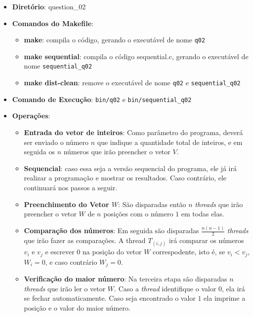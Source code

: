 \begin{itemize}
	\item{\textbf{Diretório}: question\_02}
	\item{\textbf{Comandos do Makefile}:
	\begin{itemize}
		\item{\textbf{make}: compila o código, gerando o executável de nome \texttt{q02}}
		\item{\textbf{make sequential}: compila o código sequential.c, gerando o executável de nome \texttt{sequential_q02}}
		\item{\textbf{make dist-clean}: remove o executável de nome \texttt{q02} e \texttt{sequential_q02}}
	\end{itemize}}
	\item{\textbf{Comando de Execução}: \texttt{bin/q02} e \texttt{bin/sequential_q02}}
	\item{\textbf{Operações}:
	\begin{itemize}
		\item{\textbf{Entrada do vetor de inteiros}: Como parâmetro do programa, deverá ser enviado o número $n$ que indique a quantidade total de inteiros, e em seguida os $n$ números que irão preencher o vetor $V$.}
		\item{\textbf{Sequencial}: caso essa seja a versão sequencial do programa, ele já irá realizar a programação e mostrar os resultados. Caso contrário, ele continuará nos passos a seguir.}
		\item{\textbf{Preenchimento do Vetor $W$}: São disparadas então $n$ \emph{threads} que irão preencher o vetor $W$ de $n$ posições com o número $1$ em todas elas.}
		\item{\textbf{Comparação dos números}: Em seguida são disparadas $\frac{n(n-1)}{2}$ \emph{threads} que irão fazer as comparações. A thread $T_{(i,j)}$ irá comparar os números $v_{i}$ e $v_{j}$ e escrever $0$ na posição do vetor $W$ correspodente, isto é, se $v_{i} < v_{j}$, $W_{i} = 0$, e caso contrário $W_{j} = 0$.}
		\item{\textbf{Verificação do maior número}: Na terceira etapa são disparadas $n$ \emph{threads} que irão ler o vetor $W$. Caso a \emph{thread} identifique o valor $0$, ela irá se fechar automaticamente. Caso seja encontrado o valor $1$ ela imprime a posição e o valor do maior número.}
	\end{itemize}}
\end{itemize}
